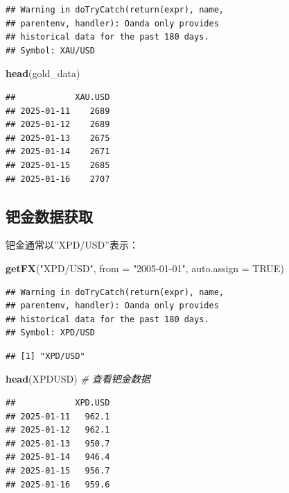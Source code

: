 \documentclass[]{ctexbook}
\newenvironment{Shaded}{\begin{snugshade}}{\end{snugshade}}
\newcommand{\AttributeTok}[1]{\textcolor[rgb]{0.13,0.29,0.53}{#1}}
\newcommand{\CommentTok}[1]{\textcolor[rgb]{0.56,0.35,0.01}{\textit{#1}}}
\newcommand{\ConstantTok}[1]{\textcolor[rgb]{0.56,0.35,0.01}{#1}}
\newcommand{\FunctionTok}[1]{\textcolor[rgb]{0.13,0.29,0.53}{\textbf{#1}}}
\newcommand{\NormalTok}[1]{#1}
\newcommand{\StringTok}[1]{\textcolor[rgb]{0.31,0.60,0.02}{#1}}
\begin{document}
\begin{verbatim}
## Warning in doTryCatch(return(expr), name,
## parentenv, handler): Oanda only provides
## historical data for the past 180 days.
## Symbol: XAU/USD
\end{verbatim}

\begin{Shaded}
\begin{Highlighting}[]
\FunctionTok{head}\NormalTok{(gold\_data)}
\end{Highlighting}
\end{Shaded}

\begin{verbatim}
##            XAU.USD
## 2025-01-11    2689
## 2025-01-12    2689
## 2025-01-13    2675
## 2025-01-14    2671
## 2025-01-15    2685
## 2025-01-16    2707
\end{verbatim}

\subsection{钯金数据获取}\label{ux94afux91d1ux6570ux636eux83b7ux53d6}

钯金通常以''XPD/USD''表示：

\begin{Shaded}
\begin{Highlighting}[]
\FunctionTok{getFX}\NormalTok{(}\StringTok{"XPD/USD"}\NormalTok{, }\AttributeTok{from =} \StringTok{"2005{-}01{-}01"}\NormalTok{, }\AttributeTok{auto.assign =} \ConstantTok{TRUE}\NormalTok{)}
\end{Highlighting}
\end{Shaded}

\begin{verbatim}
## Warning in doTryCatch(return(expr), name,
## parentenv, handler): Oanda only provides
## historical data for the past 180 days.
## Symbol: XPD/USD
\end{verbatim}

\begin{verbatim}
## [1] "XPD/USD"
\end{verbatim}

\begin{Shaded}
\begin{Highlighting}[]
\FunctionTok{head}\NormalTok{(XPDUSD)  }\CommentTok{\# 查看钯金数据}
\end{Highlighting}
\end{Shaded}

\begin{verbatim}
##            XPD.USD
## 2025-01-11   962.1
## 2025-01-12   962.1
## 2025-01-13   950.7
## 2025-01-14   946.4
## 2025-01-15   956.7
## 2025-01-16   959.6
\end{verbatim}
\end{document}
